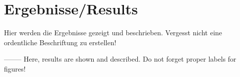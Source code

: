 \chapter{Ergebnisse/Results}
Hier werden die Ergebnisse gezeigt und beschrieben. Vergesst nicht eine ordentliche Beschriftung zu erstellen!

--------
\newline
Here, results are shown and described. Do not forget proper labels for figures!
